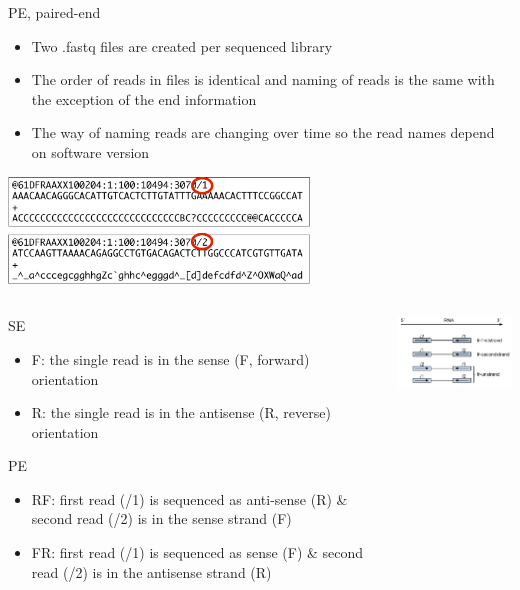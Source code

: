 \documentclass{beamer}\usepackage[]{graphicx}\usepackage[]{color}
\begin{document}
\begin{frame}
\begin{block}{PE, paired-end}
\begin{itemize}
\item Two .fastq files are created per sequenced library
\item The order of reads in files is identical and naming of reads is the same with the exception of the end information
\item The way of naming reads are changing over time so the read names depend on software version
\end{itemize}
\end{block}
\vspace{8mm}
\centering
\includegraphics[width=8cm]{Images/fastqPE.pdf}
\end{frame}

\begin{frame}
\footnotesize
\begin{columns}
\begin{column}{0.48\textwidth}
SE
\begin{itemize}
  \item F: the single read is in the sense (F, forward) orientation
  \item R: the single read is in the antisense (R, reverse) orientation
\end{itemize}
PE
\begin{itemize}
\item RF: first read (/1) is sequenced as anti-sense (R) \& second read (/2) is in the sense strand (F)
\item FR: first read (/1) is sequenced as sense (F) \& second read (/2) is in the antisense strand (R)
\end{itemize}
\end{column}
\begin{column}{0.48\textwidth}
\includegraphics[width=5cm]{Images/Stranded.png}
\end{column}
\end{columns}
\end{frame}
\end{document}
